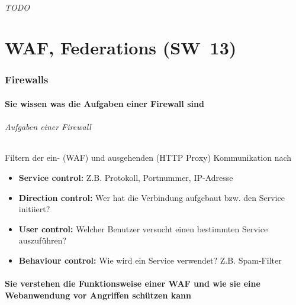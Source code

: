 \documentclass[10pt,a4paper]{article}
\begin{document}
\paragraph*{TODO}


\part{WAF, Federations (SW~13)}
\section{Firewalls}
\subsection*{Sie wissen was die Aufgaben einer Firewall sind}
\paragraph*{Aufgaben einer Firewall}Filtern der ein- (WAF) und ausgehenden (HTTP Proxy) Kommunikation nach
\begin{itemize}[noitemsep,topsep=0pt,leftmargin=*]
    \item \textbf{Service control:} Z.B. Protokoll, Portnummer, IP-Adresse
    \item \textbf{Direction control:} Wer hat die Verbindung aufgebaut bzw. den Service initiiert?
    \item \textbf{User control:} Welcher Benutzer versucht einen bestimmten Service auszuführen?
    \item \textbf{Behaviour control:} Wie wird ein Service verwendet? Z.B. Spam-Filter
\end{itemize}

\subsection*{Sie verstehen die Funktionsweise einer WAF und wie sie eine Webanwendung vor Angriffen schützen kann}
\end{document}
